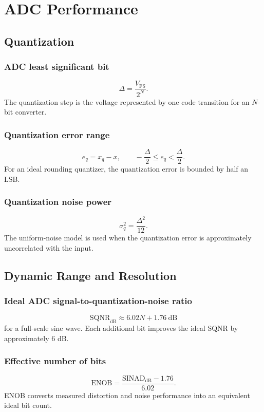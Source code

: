 \section{ADC Performance}

\subsection{Quantization}

\subsubsection{ADC least significant bit}
\[
\Delta=\frac{V_{\mathrm{FS}}}{2^N}.
\]
The quantization step is the voltage represented by one code transition for an \(N\)-bit converter.

\subsubsection{Quantization error range}
\[
e_q=x_q-x, \qquad -\frac{\Delta}{2}\leq e_q<\frac{\Delta}{2}.
\]
For an ideal rounding quantizer, the quantization error is bounded by half an LSB.

\subsubsection{Quantization noise power}
\[
\sigma_q^2=\frac{\Delta^2}{12}.
\]
The uniform-noise model is used when the quantization error is approximately uncorrelated with the input.

\subsection{Dynamic Range and Resolution}

\subsubsection{Ideal ADC signal-to-quantization-noise ratio}
\[
\mathrm{SQNR}_{\mathrm{dB}}\approx 6.02N+1.76\ \mathrm{dB}
\]
for a full-scale sine wave. Each additional bit improves the ideal SQNR by approximately \(6\) dB.

\subsubsection{Effective number of bits}
\[
\mathrm{ENOB}=\frac{\mathrm{SINAD}_{\mathrm{dB}}-1.76}{6.02}.
\]
ENOB converts measured distortion and noise performance into an equivalent ideal bit count.


